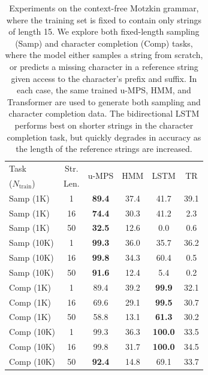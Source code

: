 \documentclass[twoside]{article}
\begin{document}
\begin{table}[t]
\caption{Experiments on the context-free Motzkin grammar, where the training set is fixed to contain only strings of length 15. We explore both fixed-length sampling (Samp) and character completion (Comp) tasks, where the model either samples a string from scratch, or predicts a missing character in a reference string given access to the character's prefix and suffix. In each case, the same trained u-MPS, HMM, and Transformer are used to generate both sampling and character completion data. The bidirectional LSTM performs best on shorter strings in the character completion task, but quickly degrades in accuracy as the length of the reference strings are increased.}
\label{tab:motzkin}
\setlength\aboverulesep{0.1pt}
\setlength\belowrulesep{0.1pt}
\renewcommand{\arraystretch}{1.1}
\begin{center}
\begin{small}
\begin{sc}
\begin{tabular}{lc|cccc}
    Task & Str. & \multirow{2}{*}{u-MPS} & \multirow{2}{*}{HMM} & \multirow{2}{*}{LSTM} & \multirow{2}{*}{TR} \\
    ($N_{\mathrm{train}}$) & Len. &      &  &  &  \\
    \midrule
    Samp (1K)  & 1  & \textbf{89.4} & 37.4 & 41.7           & 39.1 \\
    Samp (1K)  & 16 & \textbf{74.4} & 30.3 & 41.2           & 2.3  \\
    Samp (1K)  & 50 & \textbf{32.5} & 12.6 & 0.0            & 0.6  \\
    Samp (10K) & 1  & \textbf{99.3} & 36.0 & 35.7           & 36.2 \\
    Samp (10K) & 16 & \textbf{99.8} & 34.3 & 60.4           & 0.5  \\
    Samp (10K) & 50 & \textbf{91.6} & 12.4 & 5.4            & 0.2  \\
    Comp (1K)  & 1  & 89.4          & 39.2 & \textbf{99.9}  & 32.1 \\
    Comp (1K)  & 16 & 69.6          & 29.1 & \textbf{99.5}  & 30.7 \\
    Comp (1K)  & 50 & 58.8          & 13.1 & \textbf{61.3}  & 30.2 \\
    Comp (10K) & 1  & 99.3          & 36.3 & \textbf{100.0} & 33.5 \\
    Comp (10K) & 16 & 99.8          & 31.7 & \textbf{100.0} & 34.5 \\
    Comp (10K) & 50 & \textbf{92.4} & 14.8 & 69.1           & 33.7 \\
    

\end{tabular}
\end{sc}
\end{small}
\end{center}
\end{table}
\end{document}
